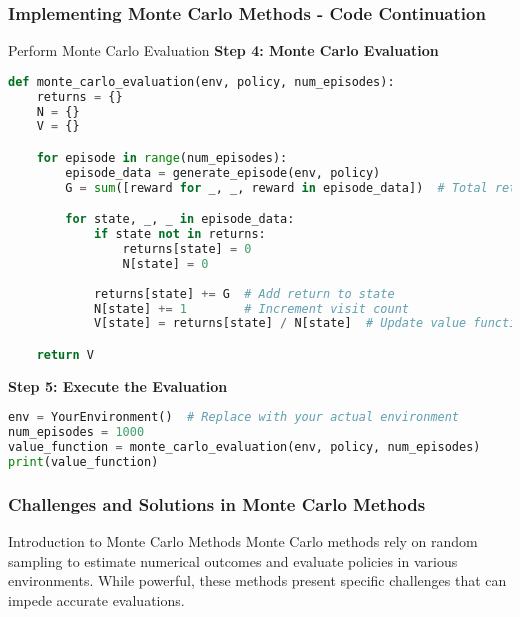 \documentclass[aspectratio=169]{beamer}
\begin{document}
\begin{frame}[fragile]
    \frametitle{Implementing Monte Carlo Methods - Code Continuation}
    \begin{block}{Perform Monte Carlo Evaluation}
        \textbf{Step 4: Monte Carlo Evaluation}
        \begin{lstlisting}[language=Python]
def monte_carlo_evaluation(env, policy, num_episodes):
    returns = {}
    N = {}
    V = {}

    for episode in range(num_episodes):
        episode_data = generate_episode(env, policy)
        G = sum([reward for _, _, reward in episode_data])  # Total return

        for state, _, _ in episode_data:
            if state not in returns:
                returns[state] = 0
                N[state] = 0
            
            returns[state] += G  # Add return to state
            N[state] += 1        # Increment visit count
            V[state] = returns[state] / N[state]  # Update value function

    return V
        \end{lstlisting}

        \textbf{Step 5: Execute the Evaluation}
        \begin{lstlisting}[language=Python]
env = YourEnvironment()  # Replace with your actual environment
num_episodes = 1000
value_function = monte_carlo_evaluation(env, policy, num_episodes)
print(value_function)
        \end{lstlisting}
    \end{block}
\end{frame}

\begin{frame}
    \frametitle{Challenges and Solutions in Monte Carlo Methods}
    \begin{block}{Introduction to Monte Carlo Methods}
        Monte Carlo methods rely on random sampling to estimate numerical outcomes and evaluate policies in various environments. While powerful, these methods present specific challenges that can impede accurate evaluations.
    \end{block}
\end{frame}
\end{document}
